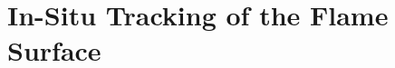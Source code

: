 \chapter{In-Situ Tracking of the Flame Surface} %
\label{cha:flame_surface_tracking}
%
%

%

%

%

%

%

%
